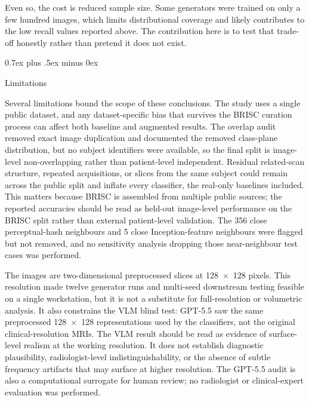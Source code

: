 \documentclass[conference,twoside]{IEEEtran}
\makeatletter
\newcommand{\bodyfont}{\rmfamily}
\def\subsection{\@startsection{subsection}{2}{\z@}{1.5ex plus 1.5ex minus 0.5ex}%
{0.7ex plus .5ex minus 0ex}{\normalfont\normalsize\bodyfont\bfseries\raggedright}}
\makeatother
\begin{document}
Even so, the cost is reduced sample size. Some generators were trained on only a few hundred images, which limits distributional coverage and likely contributes to the low recall values reported above. The contribution here is to test that trade-off honestly rather than pretend it does not exist.

\subsection{Limitations}

Several limitations bound the scope of these conclusions. The study uses a single public dataset, and any dataset-specific bias that survives the BRISC curation process \cite{fateh2026brisc} can affect both baseline and augmented results. The overlap audit removed exact image duplication and documented the removed class-plane distribution, but no subject identifiers were available, so the final split is image-level non-overlapping rather than patient-level independent. Residual related-scan structure, repeated acquisitions, or slices from the same subject could remain across the public split and inflate every classifier, the real-only baselines included. This matters because BRISC is assembled from multiple public sources; the reported accuracies should be read as held-out image-level performance on the BRISC split rather than external patient-level validation. The 356 close perceptual-hash neighbours and 5 close Inception-feature neighbours were flagged but not removed, and no sensitivity analysis dropping those near-neighbour test cases was performed.

The images are two-dimensional preprocessed slices at 128~$\times$~128 pixels. This resolution made twelve generator runs and multi-seed downstream testing feasible on a single workstation, but it is not a substitute for full-resolution or volumetric analysis. It also constrains the VLM blind test: GPT-5.5 saw the same preprocessed 128~$\times$~128 representations used by the classifiers, not the original clinical-resolution MRIs. The VLM result should be read as evidence of surface-level realism at the working resolution. It does not establish diagnostic plausibility, radiologist-level indistinguishability, or the absence of subtle frequency artifacts that may surface at higher resolution. The GPT-5.5 audit is also a computational surrogate for human review; no radiologist or clinical-expert evaluation was performed.
\end{document}
